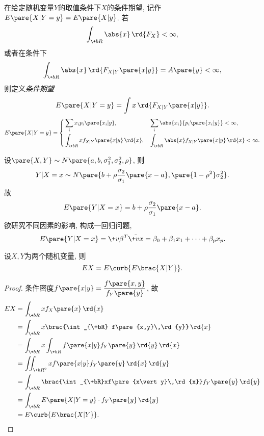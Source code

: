 \documentclass{ctexart}
\begin{document}
在给定随机变量$Y$的取值条件下$X$的条件期望, 记作$E\pare{X\vert Y=y} = E\pare{X\vert y}$. 若
\[ \int_{\+bR} \abs{x} \,\rd{F_X} < \infty, \]
或者在条件下
\[ \int_{\+bR} \abs{x}\,\rd{F_{X\vert Y}\pare{x\vert y}} = A\pare{y} < \infty, \]
则定义\emph{条件期望}
\[ E\pare{X\vert Y=y} = \int x\,\rd{F_{X\vert Y}\pare{x\vert y}}. \]
\[ E\pare{X\vert Y=y} = \left\{\begin{aligned}
    &\sum_i x_i {p_i\pare{x_i\vert y}}, && \sum_i \abs{x_i} {p_i\pare{x_i\vert y}}<\infty, \\
    &\int_{\+bR} x f_{X\vert Y}\pare{x\vert y}\,\rd{x}, && \int_{\+bR} \abs{x} f_{X\vert Y}\pare{x\vert y}\,\rd{x} < \infty.
\end{aligned}\right. \]
\begin{sample}
    \begin{ex}
        设$\pare{X,Y}\sim N\pare{a,b,\sigma_1^2,\sigma_2^2, \rho}$, 则
        \[ Y\vert X=x \sim N\pare{b+\rho \frac{\sigma_2}{\sigma_1}\pare{x-a}, \pare{1-\rho^2}\sigma_2^2}. \]
        故
        \[ E\pare{Y\vert X=x} = b + \rho \frac{\sigma_2}{\sigma_1} \pare{x-a}. \]
        欲研究不同因素的影响, 构成一回归问题,
        \[ E\pare{Y\vert X=x} = \+v\beta^T \tilde{\+vx} = \beta_0 + \beta_1 x_1 + \cdots + \beta_p x_p. \]
    \end{ex}
\end{sample}
\begin{theorem}[全期望公式]
    设$X,Y$为两个随机变量, 则
    \[ EX = E\curb{E\brac{X\vert Y}}. \]
\end{theorem}
\begin{proof}
    条件密度$\displaystyle f\pare{x\vert y} = \frac{f\pare{x,y}}{f_Y\pare{y}}$, 故
    \begin{align*}
        EX &= \int_{\+bR} xf_X\pare{x}\,\rd{x} \\
        &= \int_{\+bR} x\brac{\int_{\+bR} f\pare{x,y}\,\rd{y}}\,\rd{x} \\
        &= \int_{\+bR} x\int_{\+bR} f\pare{x\vert y}f_Y\pare{y}\,\rd{y}\,\rd{x} \\
        &= \iint_{\+bR^2} xf\pare{x\vert y} f_Y\pare{y} \,\rd{x}\,\rd{y} \\
        &= \int_{\+bR} \brac{\int_{\+bR}xf\pare{x\vert y}\,\rd{x}}f_Y\pare{y}\,\rd{y} \\
        &= \int_{\+bR} E\pare{X\vert Y=y} \cdot f_Y\pare{y}\,\rd{y} \\
        &= E\curb{E\brac{X\vert Y}}. \qedhere
    \end{align*}
\end{proof}
\end{document}
